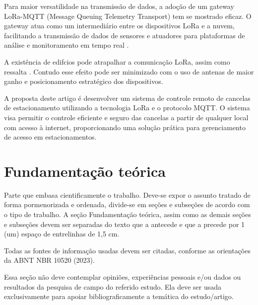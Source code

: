 \documentclass[
article,			%
11pt,				%
twoside,			%
a4paper,			%
section=TITLE,		%
onecolumn,          %
english,			%
brazil,				%
sumario=tradicional
]{abntex2}
\begin{document}
    Para maior versatilidade na transmissão de dados, a adoção de um gateway LoRa-MQTT (Message Queuing Telemetry Transport) tem se mostrado eficaz. O gateway atua como um intermediário entre os dispositivos LoRa e a nuvem, facilitando a transmissão de dados de sensores e atuadores para plataformas de análise e monitoramento em tempo real \cite{Bhawiyuga2019}.
    
    A existência de edifcios pode atrapalhar a comunicação LoRa, assim como ressalta \cite{lima2023}. Contudo esse efeito pode ser minimizado com o uso de antenas de maior ganho e posicionamento estratégico dos dispositivos.
    
    A proposta deste artigo é desenvolver um sistema de controle remoto de cancelas de estacionamento utilizando a tecnologia LoRa e o protocolo MQTT. O sistema visa permitir o controle eficiente e seguro das cancelas a partir de qualquer local com acesso à internet, proporcionando uma solução prática para gerenciamento de acesso em estacionamentos.  


\section{Fundamentação teórica}

Parte que embasa cientificamente o trabalho. Deve-se expor o assunto tratado de forma pormenorizada e ordenada, divide-se em seções e subseções de acordo com o tipo de trabalho. A seção Fundamentação teórica, assim como as demais seções e subseções devem ser separadas do texto que a antecede e que a precede por 1 (um) espaço de entrelinhas de 1,5 cm.

Todas as fontes de informação usadas devem ser citadas, conforme as orientações da ABNT NBR 10520 (2023). 

Essa seção não deve contemplar opiniões, experiências pessoais e/ou dados ou resultados da pesquisa de campo do referido estudo. Ela deve ser usada exclusivamente para apoiar bibliograficamente a temática do estudo/artigo.
\end{document}
